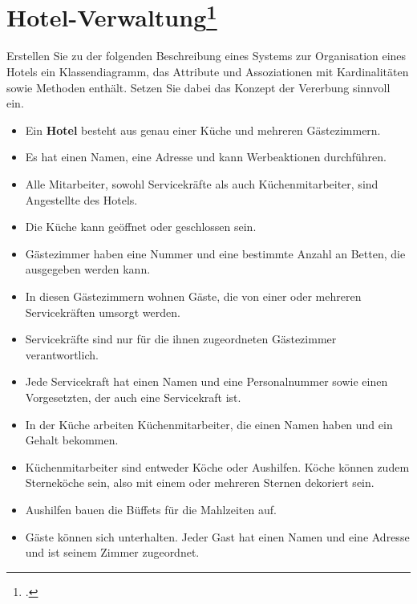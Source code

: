 \documentclass{lehramt-informatik-minimal}
\begin{document}
\section{Hotel-Verwaltung\footcite[leicht verändert, Thema 2 Teilaufgabe 2 Aufgabe 1]{examen:46116:2012:03}}

Erstellen Sie zu der folgenden Beschreibung eines Systems zur
Organisation eines Hotels ein Klassendiagramm, das Attribute und
Assoziationen mit Kardinalitäten sowie Methoden enthält. Setzen Sie
dabei das Konzept der Vererbung sinnvoll ein.

\begin{itemize}
\item Ein \textbf{Hotel} besteht aus genau einer Küche und mehreren Gästezimmern.

\item Es hat einen Namen, eine Adresse und kann Werbeaktionen
durchführen.

\item Alle Mitarbeiter, sowohl Servicekräfte als auch
Küchenmitarbeiter, sind Angestellte des Hotels.

\item Die Küche kann geöffnet oder geschlossen sein.

\item Gästezimmer haben eine Nummer und eine bestimmte Anzahl an Betten,
die ausgegeben werden kann.

\item In diesen Gästezimmern wohnen Gäste, die von einer oder mehreren
Servicekräften umsorgt werden.

\item Servicekräfte sind nur für die ihnen zugeordneten Gästezimmer
verantwortlich.

\item Jede Servicekraft hat einen Namen und eine Personalnummer sowie
einen Vorgesetzten, der auch eine Servicekraft ist.

\item In der Küche arbeiten Küchenmitarbeiter, die einen Namen haben und
ein Gehalt bekommen.

\item Küchenmitarbeiter sind entweder Köche oder Aushilfen. Köche können
zudem Sterneköche sein, also mit einem oder mehreren Sternen dekoriert
sein.

\item Aushilfen bauen die Büffets für die Mahlzeiten auf.

\item Gäste können sich unterhalten. Jeder Gast hat einen Namen und eine
Adresse und ist seinem Zimmer zugeordnet.
\end{itemize}
\end{document}
